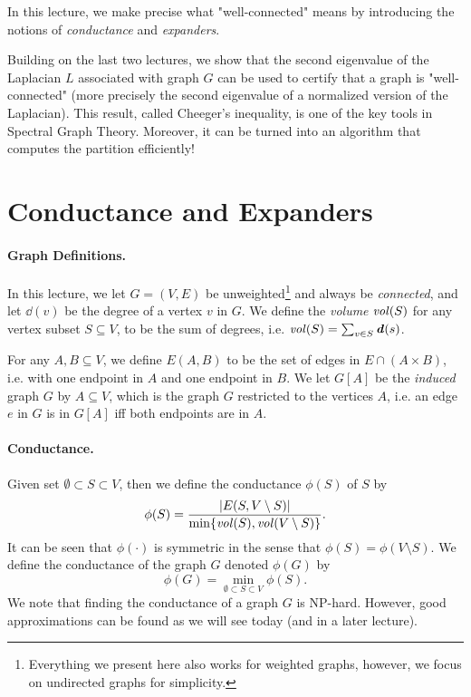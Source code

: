 In this lecture, we make precise what "well-connected" means by introducing the notions of \emph{conductance} and \emph{expanders}. 

Building on the last two lectures, we show that the second eigenvalue of the Laplacian $L$ associated with graph $G$ can be used to certify that a graph is "well-connected" (more precisely the second eigenvalue of a normalized version of the Laplacian). This result, called Cheeger's inequality, is one of the key tools in Spectral Graph Theory. Moreover, it can be turned into an algorithm that computes the partition efficiently!

\section{Conductance and Expanders}

\paragraph{Graph Definitions.} In this lecture, we let $G=(V,E)$ be unweighted\footnote{Everything we present here also works for weighted graphs, however, we focus on undirected graphs for simplicity.} and always be \emph{connected}, and let $\dd(v)$ be the degree of a vertex $v$ in $G$. We define the \emph{volume} $\mathit{vol}(S)$ for any vertex subset $S \subseteq V$, to be the sum of degrees, i.e. $\mathit{vol}(S) = \sum_{v \in S} \boldsymbol{\mathit{d}}(s)$. 

For any  $A, B \subseteq V$, we define $E(A, B)$ to be the set of edges in $E \cap (A \times B)$, i.e. with one endpoint in $A$ and one endpoint in $B$. We let $G[A]$ be the \emph{induced} graph $G$ by $A \subseteq V$, which is the graph $G$ restricted to the vertices $A$, i.e. an edge $e$ in $G$ is in $G[A]$ iff both endpoints are in $A$.

\paragraph{Conductance.} Given set $\emptyset \subset S \subset V$, then we define the conductance $\phi(S)$ of $S$ by
\[
\phi(S) = \frac{|E(S, V \setminus S)|}{ \min\{\mathit{vol}(S), \mathit{vol}(V \setminus S) \} }.
\]
It can be seen that $\phi(\cdot)$ is symmetric in the sense that $\phi(S) = \phi(V \setminus S)$. We define the conductance of the graph $G$ denoted $\phi(G)$ by
\[
    \phi(G) = \min_{\emptyset \subset S \subset V} \phi(S). 
\]
We note that finding the conductance of a graph $G$ is NP-hard. However, good approximations can be found as we will see today (and in a later lecture).

